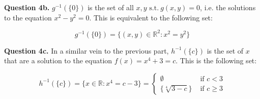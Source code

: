\documentclass[letterpaper, reqno,11pt]{article}
\newcommand{\RR}{\mathbb{R}}
\newcommand{\st}{\text{ s.t.}\ }
\begin{document}
{\noindent\bf Question 4b.} $g^{-1}(\{0\})$ is the set of all $x, y\st g(x, y)=0$, i.e. the solutions to the equation $x^2-y^2=0$. This is equivalent to the following set: 

\[
    g^{-1}(\{0\})=\{(x, y)\in\RR^2:x^2=y^2\}
\]

{\noindent\bf Question 4c.} In a similar vein to the previous part, $h^{-1}(\{c\})$ is the set of $x$ that are a solution to the equation $f(x)=x^4+3=c$. This is the following set: 

\[
    h^{-1}(\{c\})=\{x\in\RR:x^4=c-3\}=\begin{cases}\emptyset &\text{ if }c<3\\\{\sqrt[4]{3-c}\}&\text{ if }c\geq 3\end{cases}
\]
\end{document}
